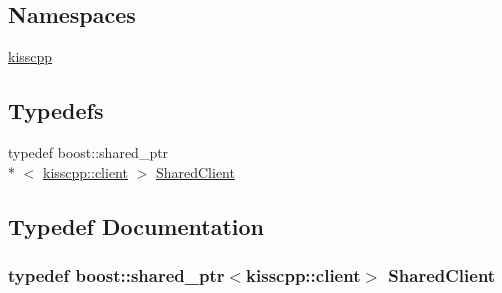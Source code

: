 \subsection*{Namespaces}
\begin{DoxyCompactItemize}
\item 
\hyperlink{a00089}{kisscpp}
\end{DoxyCompactItemize}
\subsection*{Typedefs}
\begin{DoxyCompactItemize}
\item 
typedef boost\-::shared\-\_\-ptr\\*
$<$ \hyperlink{a00020}{kisscpp\-::client} $>$ \hyperlink{a00050_a397be11bebf53d9d2cbed76362248eb5}{Shared\-Client}
\end{DoxyCompactItemize}


\subsection{Typedef Documentation}
\hypertarget{a00050_a397be11bebf53d9d2cbed76362248eb5}{
\subsubsection[{Shared\-Client}]{\setlength{\rightskip}{0pt plus 5cm}typedef boost\-::shared\-\_\-ptr$<${\bf kisscpp\-::client}$>$ {\bf Shared\-Client}}}\label{a00050_a397be11bebf53d9d2cbed76362248eb5}
